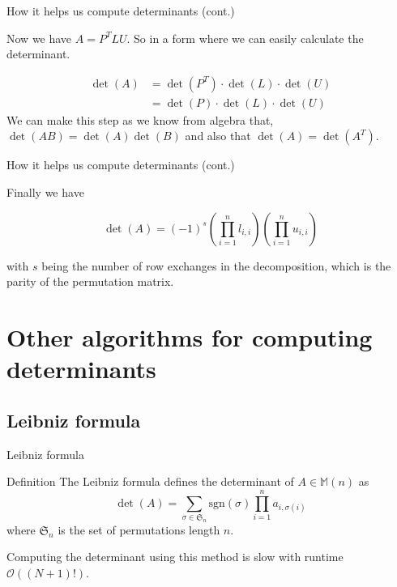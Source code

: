 \documentclass{beamer}
\begin{document}
\begin{frame}{How it helps us compute determinants (cont.)}

    Now we have $A=P^T LU$. So in a form where we can easily calculate the determinant.

    \begin{align*}
        \det(A) &= \det(P^T)\cdot\det(L)\cdot\det(U) \\
                &= \det(P)\cdot\det(L)\cdot\det(U)
    \end{align*}
    We can make this step as we know from algebra that,
    $\det(AB) = \det(A)\det(B)$ and also that $\det(A) = \det(A^T)$.

\end{frame}

\begin{frame}{How it helps us compute determinants (cont.)}

    Finally we have

    \[
        \det(A) = {(-1)}^s \left( \prod_{i=1}^{n} l_{i,i} \right)
        \left( \prod_{i=1}^{n} u_{i,i} \right)
    \]

    with $s$ being the number of row exchanges in the decomposition,
    which is the parity of the permutation matrix.

\end{frame}

\section{Other algorithms for computing determinants}

\subsection{Leibniz formula}

\begin{frame}{Leibniz formula}

    \begin{block}{Definition}
        The Leibniz formula defines the determinant of $A \in \mathbb{M}(n)$ as
        \[
            \det(A) = \sum_{\sigma \in \mathfrak{S}_n} \text{sgn}(\sigma)
            \prod_{i=1}^n a_{i,\sigma(i)}
        \]
        where $\mathfrak{S}_n$ is the set of permutations length $n$.
    \end{block}

    Computing the determinant using this method is slow with runtime $\mathcal{O}((N+1)!)$.

\end{frame}
\end{document}
